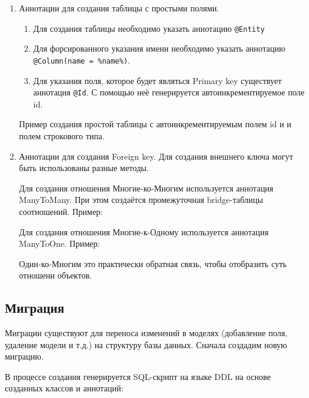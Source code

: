 \documentclass[a4paper]{article}
\begin{document}
\begin{enumerate}
	\item Аннотации для создания таблицы с простыми полями.
	\begin{enumerate}
		\item Для создания таблицы необходимо указать аннотацию \lstinline[]|@Entity|
		\item Для форсированного указания имени необходимо указать аннотацию \lstinline[]|@Column(name = %name%)|.
		\item Для указания поля, которое будет являться Primary key существует аннотация \lstinline[]|@Id|. С помощью неё генерируется автоинкрементируемое поле id.
	\end{enumerate}

	Пример создания простой таблицы с автоинкрементируемым полем id и и полем строкового типа. 
	
	\item Аннотации для создания Foreign key.
	Для создания внешнего ключа могут быть использованы разные методы. 
	
	Для создания отношения Многие-ко-Многим используется аннотация ManyToMany. При этом создаётся промежуточная bridge-таблицы соотношений. Пример:
	
	
	Для создания отношения Многие-к-Одному используется аннотация ManyToOne. Пример:
	
	
	Один-ко-Многим это практически обратная связь, чтобы отобразить суть отношени объектов.
\end{enumerate}

\subsection{Миграция}
Миграции существуют для переноса изменений в моделях (добавление поля, удаление модели и т.д.) на структуру базы данных.
Сначала создадим новую миграцию.

В процессе создания генерируется SQL-скрипт на языке DDL на основе созданных классов и аннотаций: 

\end{document}
